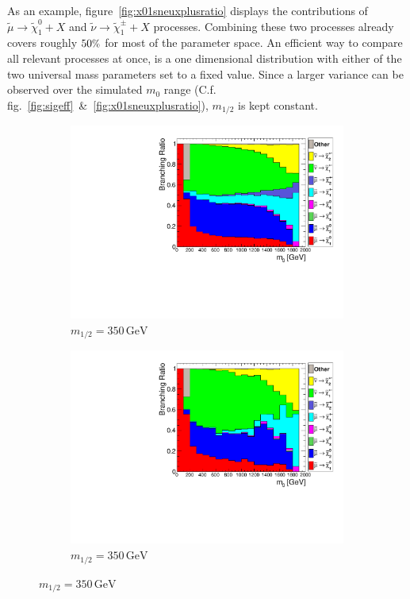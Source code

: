 \noindent As an example, figure~\ref{fig:x01sneuxplusratio} displays the contributions of $\tilde{\mu} \rightarrow \tilde{\chi}^0_1 + X$ and $\tilde{\nu} \rightarrow \tilde{\chi}^\pm_1 + X$ processes. Combining these two processes already covers roughly $50\pct$ for most of the parameter space. An efficient way to compare all relevant processes at once, is a one dimensional distribution with either of the two universal mass parameters set to a fixed value. Since a larger variance can be observed over the simulated $m_0$ range (C.f. fig.~\ref{fig:sigeff}~\&~\ref{fig:x01sneuxplusratio}), $m_{1/2}$ is kept constant.

\begin{figure}[ht!]
  \centering
  \begin{subfigure}[b]{0.495\textwidth}
    \centering
    \includegraphics[width=\textwidth]{plots/hCrossRatio350.pdf}
    \caption{$m_{1/2} = 350\,\text{GeV}$\label{fig:crossratio350}}
  \end{subfigure}
  \begin{subfigure}[b]{0.495\textwidth}
    \centering
    \includegraphics[width=\textwidth]{plots/hCutCrossRatio350.pdf}
    \caption{$m_{1/2} = 350\,\text{GeV}$\label{fig:cutcrossratio350}}
  \end{subfigure}


\end{figure}

